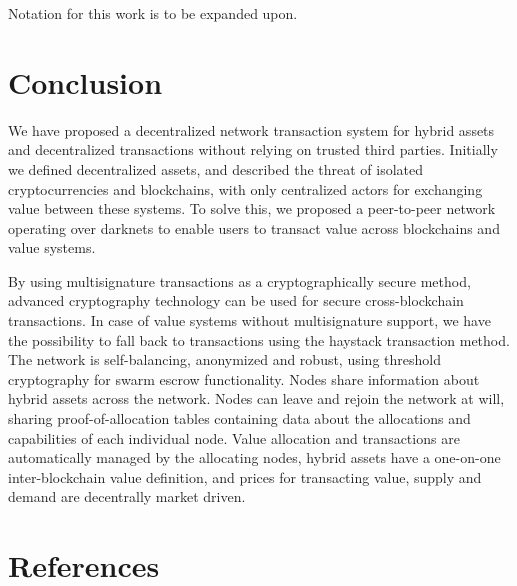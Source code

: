 \documentclass[a4paper,fullpack]{article}
\begin{document}
Notation for this work is to be expanded upon.


\section{Conclusion}

We have proposed a decentralized network transaction system for hybrid assets and decentralized transactions without relying on trusted third parties. Initially we defined decentralized assets, and described the threat of isolated cryptocurrencies and blockchains, with only centralized actors for exchanging value between these systems. To solve this, we proposed a peer-to-peer network operating over darknets to enable users to transact value across blockchains and value systems. 

By using multisignature transactions as a cryptographically secure method, advanced cryptography technology can be used for secure cross-blockchain transactions. In case of value systems without multisignature support, we have the possibility to fall back to transactions using the haystack transaction method. The network is self-balancing, anonymized and robust, using threshold cryptography for swarm escrow functionality. Nodes share information about hybrid assets across the network. Nodes can leave and rejoin the network at will, sharing proof-of-allocation tables containing data about the allocations and capabilities of each individual node. Value allocation and transactions are automatically managed by the allocating nodes, hybrid assets have a one-on-one inter-blockchain value definition, and prices for transacting value, supply and demand are decentrally market driven.


\section{References}

{}

\end{document}
